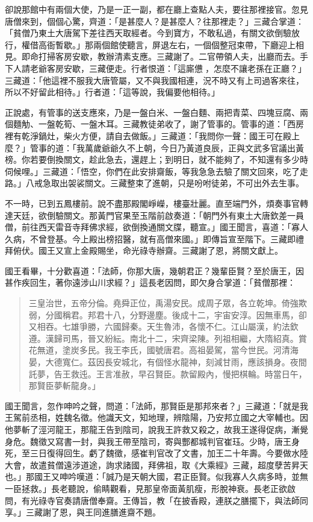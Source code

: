 卻說那館中有兩個大使，乃是一正一副，都在廳上查點人夫，要往那裡接官。忽見唐僧來到，個個心驚，齊道：「是甚麼人？是甚麼人？往那裡走？」三藏合掌道：「貧僧乃東土大唐駕下差往西天取經者。今到寶方，不敢私過，有關文欲倒驗放行，權借高衙暫歇。」那兩個館使聽言，屏退左右，一個個整冠束帶，下廳迎上相見。即命打掃客房安歇，教辦清素支應。三藏謝了。二官帶領人夫，出廳而去。手下人請老爺客房安歇，三藏便走。行者恨道：「這廝憊𪬯，怎麼不讓老孫在正廳？」三藏道：「他這裡不服我大唐管屬，又不與我國相連，況不時又有上司過客來往，所以不好留此相待。」行者道：「這等說，我偏要他相待。」

正說處，有管事的送支應來，乃是一盤白米、一盤白麵、兩把青菜、四塊豆腐、兩個麵觔、一盤乾筍、一盤木耳。三藏教徒弟收了，謝了管事的。管事的道：「西房裡有乾淨鍋灶，柴火方便，請自去做飯。」三藏道：「我問你一聲：國王可在殿上麼？」管事的道：「我萬歲爺爺久不上朝，今日乃黃道良辰，正與文武多官議出黃榜。你若要倒換關文，趁此急去，還趕上；到明日，就不能夠了，不知還有多少時伺候哩。」三藏道：「悟空，你們在此安排齋飯，等我急急去驗了關文回來，吃了走路。」八戒急取出袈裟關文。三藏整束了進朝，只是吩咐徒弟，不可出外去生事。

不一時，已到五鳳樓前。說不盡那殿閣崢嶸，樓臺壯麗。直至端門外，煩奏事官轉達天廷，欲倒驗關文。那黃門官果至玉階前啟奏道：「朝門外有東土大唐欽差一員僧，前往西天雷音寺拜佛求經，欲倒換通關文牒，聽宣。」國王聞言，喜道：「寡人久病，不曾登基。今上殿出榜招醫，就有高僧來國。」即傳旨宣至階下。三藏即禮拜俯伏。國王又宣上金殿賜坐，命光祿寺辦齋。三藏謝了恩，將關文獻上。

國王看畢，十分歡喜道：「法師，你那大唐，幾朝君正？幾輩臣賢？至於唐王，因甚作疾回生，著你遠涉山川求經？」這長老因問，即欠身合掌道：「貧僧那裡：
\begin{quote}
三皇治世，五帝分倫。堯舜正位，禹湯安民。成周子眾，各立乾坤。倚強欺弱，分國稱君。邦君十八，分野邊塵。後成十二，宇宙安淳。因無車馬，卻又相吞。七雄爭勝，六國歸秦。天生魯沛，各懷不仁。江山屬漢，約法欽遵。漢歸司馬，晉又紛紜。南北十二，宋齊梁陳。列祖相繼，大隋紹真。賞花無道，塗炭多民。我王李氏，國號唐君。高祖晏駕，當今世民。河清海晏，大德寬仁。茲因長安城北，有個怪水龍神，刻減甘雨，應該損身。夜間託夢，告王救迍。王言准赦，早召賢臣。款留殿內，慢把棋輪。時當日午，那賢臣夢斬龍身。」
\end{quote}

國王聞言，忽作呻吟之聲，問道：「法師，那賢臣是那邦來者？」三藏道：「就是我王駕前丞相，姓魏名徵。他識天文，知地理，辨陰陽，乃安邦立國之大宰輔也。因他夢斬了涇河龍王，那龍王告到陰司，說我王許救又殺之，故我王遂得促病，漸覺身危。魏徵又寫書一封，與我王帶至陰司，寄與酆都城判官崔珏。少時，唐王身死，至三日復得回生。虧了魏徵，感崔判官改了文書，加王二十年壽。今要做水陸大會，故遣貧僧遠涉道途，詢求諸國，拜佛祖，取《大乘經》三藏，超度孽苦昇天也。」那國王又呻吟嘆道：「誠乃是天朝大國，君正臣賢。似我寡人久病多時，並無一臣拯救。」長老聽說，偷睛觀看，見那皇帝面黃肌瘦，形脫神衰。長老正欲啟問，有光祿寺官奏請唐僧奉齋。王傳旨，教「在披香殿，連朕之膳擺下，與法師同享。」三藏謝了恩，與王同進膳進齋不題。

